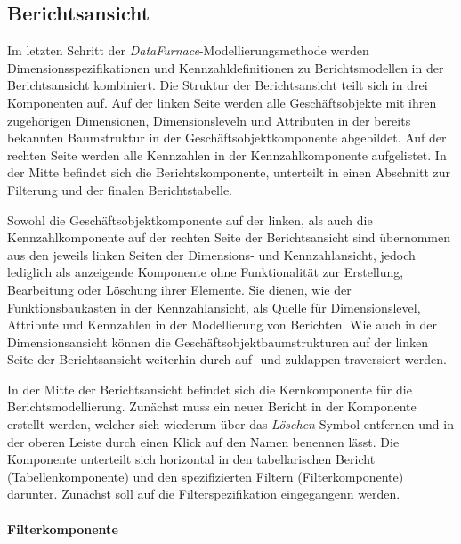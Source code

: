 \documentclass[
  language=german, %
  type=bachelor,%
  ngerman
]{isthesis}
\begin{document}
\begin{content}
  \subsection{Berichtsansicht}

  Im letzten Schritt der \textit{DataFurnace}-Modellierungsmethode werden
  Dimensionsspezifikationen und Kennzahldefinitionen zu Berichtsmodellen in der
  Berichtsansicht kombiniert. Die Struktur der Berichtsansicht teilt sich in
  drei Komponenten auf. Auf der linken Seite werden alle Geschäftsobjekte mit
  ihren zugehörigen Dimensionen, Dimensionsleveln und Attributen in der
  bereits bekannten Baumstruktur in der Geschäftsobjektkomponente abgebildet.
  Auf der rechten Seite werden alle Kennzahlen in der Kennzahlkomponente
  aufgelistet. In der Mitte befindet sich die Berichtskomponente, unterteilt in
  einen Abschnitt zur Filterung und der finalen Berichtstabelle.

  Sowohl die Geschäftsobjektkomponente auf der linken, als auch die
  Kennzahlkomponente auf der rechten Seite der Berichtsansicht sind übernommen
  aus den jeweils linken Seiten der Dimensions- und Kennzahlansicht, jedoch
  lediglich als anzeigende Komponente ohne Funktionalität zur Erstellung,
  Bearbeitung oder Löschung ihrer Elemente. Sie dienen, wie der
  Funktionsbaukasten in der Kennzahlansicht, als Quelle für Dimensionslevel,
  Attribute und Kennzahlen in der Modellierung von Berichten. Wie auch in der
  Dimensionsansicht können die Geschäftsobjektbaumstrukturen auf der linken
  Seite der Berichtsansicht weiterhin durch auf- und zuklappen traversiert
  werden.

  In der Mitte der Berichtsansicht befindet sich die Kernkomponente für die
  Berichtsmodellierung. Zunächst muss ein neuer Bericht
  in der Komponente erstellt werden, welcher sich wiederum über das
  \textit{Löschen}-Symbol entfernen und in der oberen Leiste durch einen Klick
  auf den Namen benennen lässt. Die Komponente unterteilt sich horizontal in
  den tabellarischen Bericht (Tabellenkomponente) und den spezifizierten
  Filtern (Filterkomponente) darunter. Zunächst soll auf die
  Filterspezifikation eingegangenn werden. 
  
  \paragraph{Filterkomponente}
  

\end{content}
\end{document}
